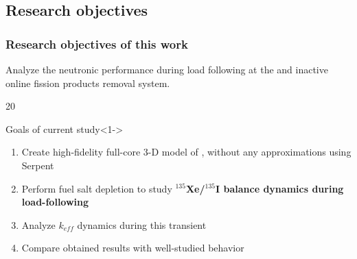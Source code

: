 \subsection{Research objectives}

\begin{frame}
  \frametitle{Research objectives of this work}
     Analyze the   neutronic performance during 
     load following at the  and inactive online fission products 
     removal system.
  \begin{overlayarea}{\linewidth}{20\baselineskip}
     \begin{block}{Goals of current study}<1->
         \begin{enumerate}
         		\itemsep1em
                \item<1-> Create high-fidelity full-core 3-D model of 
                 , without any
approximations 
                using Serpent 
                \cite{leppanen_serpent_2014}
                \item<2-> Perform fuel salt depletion to study 
                \textbf{$^{135}$Xe/$^{135}$I balance dynamics during 
                load-following}
            	\item<3-> Analyze $k_{eff}$ dynamics during this transient 
                \item<4-> Compare obtained results with well-studied 
                 behavior
         \end{enumerate}
      \end{block}
  \end{overlayarea}
\end{frame}
